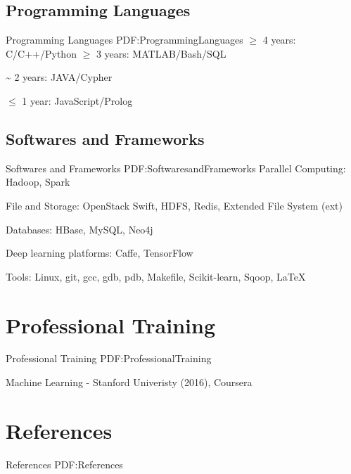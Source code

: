 \documentclass[letterpaper,10pt,oneside]{article}
\begin{document}
\begin{body}
\subsection
{Programming Languages}
{Programming Languages}
{PDF:ProgrammingLanguages}
\GapNoBreak
\BulletItem
$\geq$ 4 years: C/C++/Python
\GapNoBreak
\BulletItem
$\geq$ 3 years: MATLAB/Bash/SQL

\GapNoBreak
{} {\textasciitilde} 2 years: JAVA/Cypher

\GapNoBreak
\BulletItem
$\leq$ 1 year: JavaScript/Prolog
\BigGap
\GapNoBreak
\subsection
{Softwares and Frameworks}
{Softwares and Frameworks}
{PDF:SoftwaresandFrameworks}
\GapNoBreak
\BulletItem
Parallel Computing: Hadoop, Spark

\GapNoBreak
\BulletItem
File and Storage: OpenStack Swift, HDFS, Redis, Extended File System (ext)

\GapNoBreak
\BulletItem
Databases: HBase, MySQL, Neo4j

\GapNoBreak
\BulletItem
Deep learning platforms: Caffe, TensorFlow

\GapNoBreak
\BulletItem
Tools: Linux, git, gcc, gdb, pdb, Makefile, Scikit-learn, Sqoop,
{\LaTeX}


\section
{Professional Training}
{Professional Training}
{PDF:ProfessionalTraining}

Machine Learning - Stanford Univeristy (2016), Coursera






\iffalse
\section
{References}
{References}
{PDF:References}


\end{body}
\end{document}
